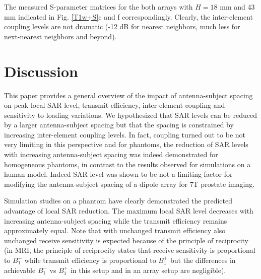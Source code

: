 \documentclass[fleqn,10pt]{wlscirep}
\begin{document}
The measured S-parameter matrices for the both arrays with $H=18$ mm and 43 mm  indicated in  Fig. \ref{T1w+S}c and f correspondingly. Clearly, the inter-element coupling levels are not dramatic (-12 dB for nearest neighbors, much less for next-nearest neighbors and beyond). 

\section*{Discussion}

This paper provides a general overview of the impact of antenna-subject spacing on peak local SAR level, transmit efficiency, inter-element coupling and sensitivity to loading variations. We hypothesized that SAR levels can be reduced by a larger antenna-subject spacing but that the spacing is constrained by increasing inter-element coupling levels. In fact, coupling turned out to be not very limiting in this perspective and for phantoms, the reduction of SAR levels with increasing antenna-subject spacing was indeed demonstrated for homogeneous phantoms, in contrast to the results observed for simulations on a human model. Indeed SAR level was shown to be not a limiting factor for modifying the antenna-subject spacing of a dipole array for 7T prostate imaging. 

Simulation studies on a phantom have clearly demonstrated the predicted advantage of local SAR reduction. The maximum local SAR level decreases with increasing antenna-subject spacing while the transmit efficiency remains approximately equal. Note that with unchanged transmit efficiency also unchanged receive sensitivity is expected because of the principle of reciprocity (in MRI, the principle of reciprocity states that receive sensitivity is proportional to $B_1^{-}$ while transmit efficiency is proportional to $B_1^{+}$ but the differences in achievable $B_1^{-}$ vs $B_1^{+}$ in this setup and in an array setup are negligible).
\end{document}
